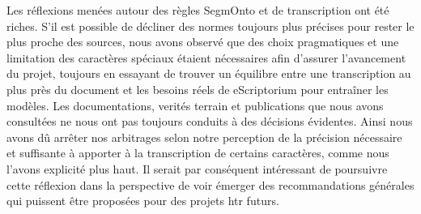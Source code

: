 \documentclass{article}
\begin{document}
Les réflexions menées autour des règles SegmOnto et de transcription ont été riches. S'il est possible de décliner des normes toujours plus précises pour rester le plus proche des sources, nous avons observé que des choix pragmatiques et une limitation des caractères spéciaux étaient nécessaires afin d'assurer l'avancement du projet, toujours en essayant de trouver un équilibre entre une transcription au plus près du document et les besoins réels de eScriptorium pour entraîner les modèles. Les documentations, verités terrain et publications que nous avons consultées ne nous ont pas toujours conduits à des décisions évidentes. Ainsi nous avons dû arrêter nos arbitrages selon notre perception de la précision nécessaire et suffisante à apporter à la transcription de certains caractères, comme nous l'avons explicité plus haut. Il serait par conséquent intéressant de poursuivre cette réflexion dans la perspective de voir émerger des recommandations générales qui puissent être proposées pour des projets \gls{htr} futurs.

\printglossaries

\printbibheading

\printbibliography[heading=subbibliography,title=Projets et ressources,keyword=projets]

\printbibliography[heading=subbibliography,title=Notices,keyword=notices]

\printbibliography[heading=subbibliography,title=Études,keyword=autres]
\end{document}
